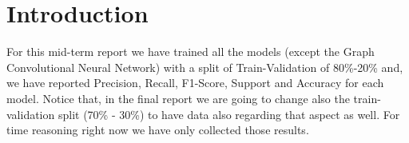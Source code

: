 \section{Introduction}
For this mid-term report we have trained all the models (except the Graph Convolutional Neural Network) with a split of Train-Validation of 80\%-20\% and, we have reported Precision, Recall, F1-Score, Support and Accuracy for each model.
Notice that, in the final report we are going to change also the train-validation split (70\% - 30\%) to have data also regarding that aspect as well. For time reasoning right now we have only collected those results.